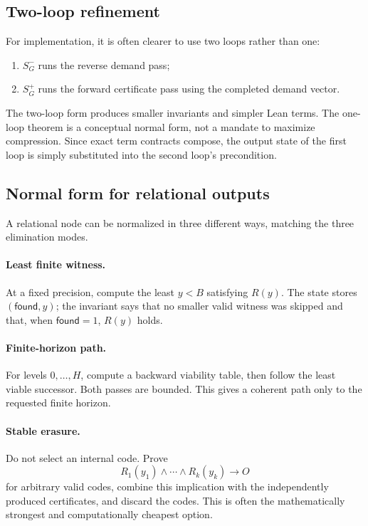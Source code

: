 \subsection{Two-loop refinement}

For implementation, it is often clearer to use two loops rather than one:

\begin{enumerate}
\item \(S_G^-\) runs the reverse demand pass;
\item \(S_G^+\) runs the forward certificate pass using the completed demand vector.
\end{enumerate}

The two-loop form produces smaller invariants and simpler Lean terms.  The one-loop theorem is a conceptual normal form, not a mandate to maximize compression.  Since exact term contracts compose, the output state of the first loop is simply substituted into the second loop's precondition.

\subsection{Normal form for relational outputs}

A relational node can be normalized in three different ways, matching the three elimination modes.

\paragraph{Least finite witness.}
At a fixed precision, compute the least \(y<B\) satisfying \(R(y)\).  The state stores \((\mathsf{found},y)\); the invariant says that no smaller valid witness was skipped and that, when \(\mathsf{found}=1\), \(R(y)\) holds.

\paragraph{Finite-horizon path.}
For levels \(0,\ldots,H\), compute a backward viability table, then follow the least viable successor.  Both passes are bounded.  This gives a coherent path only to the requested finite horizon.

\paragraph{Stable erasure.}
Do not select an internal code.  Prove
\[
  R_1(y_1)\wedge\cdots\wedge R_k(y_k)\to O
\]
for arbitrary valid codes, combine this implication with the independently produced certificates, and discard the codes.  This is often the mathematically strongest and computationally cheapest option.


